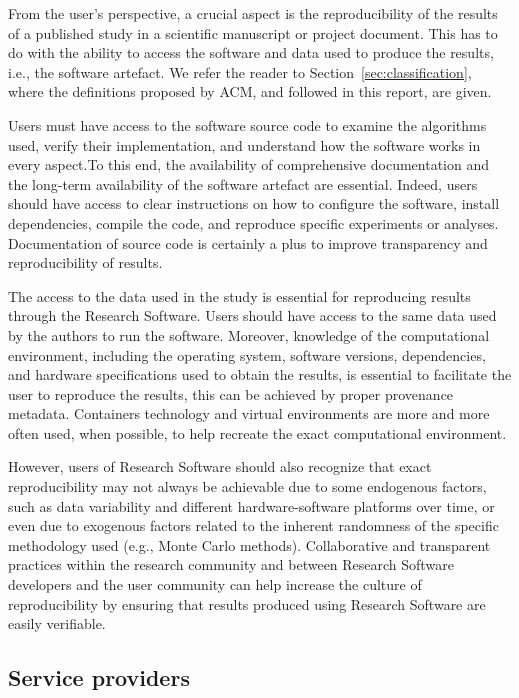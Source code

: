 From the user's perspective, a crucial aspect is the reproducibility of the results of a published study in a scientific manuscript or project document. This has to do with the ability to access the software and data used to produce the results, i.e., the software artefact. We refer the reader to Section~\ref{sec:classification}, where the definitions proposed by ACM, and followed in this report, are given.

Users must have access to the software source code to examine the algorithms used, verify their implementation, and understand how the software works in every aspect.To this end, the availability of comprehensive documentation and the long-term availability of the software artefact are essential. Indeed, users should have access to clear instructions on how to configure the software, install dependencies, compile the code, and reproduce specific experiments or analyses. Documentation of source code is certainly a plus to improve transparency and reproducibility of results.

The access to the data used in the study is essential for reproducing results through the Research Software. Users should have access to the same data used by the authors to run the software. Moreover, knowledge of the computational environment, including the operating system, software versions, dependencies, and hardware specifications used to obtain the results, is essential to facilitate the user to reproduce the results, this can be achieved by proper provenance metadata. Containers technology and virtual environments are more and more often used, when possible, to help recreate the exact computational environment.

However, users of Research Software should also recognize that exact reproducibility may not always be achievable due to some endogenous factors, such as data variability and different hardware-software platforms over time, or even due to exogenous factors related to the inherent randomness of the specific methodology used (e.g., Monte Carlo methods). Collaborative and transparent practices within the research community and between Research Software developers and the user community can help increase the culture of reproducibility by ensuring that results produced using Research Software are easily verifiable.

\subsection{Service providers}


